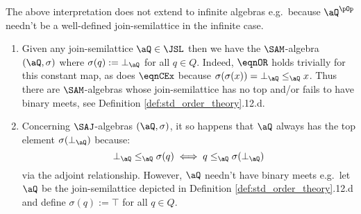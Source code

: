 \documentclass{article}
\begin{document}
\begin{note}
\item
The above interpretation does not extend to infinite algebras e.g.\ because $\aQ^{\pOp}$ needn't be a well-defined join-semilattice in the infinite case.
\begin{enumerate}
\item
Given any join-semilattice $\aQ \in \JSL$ then we have the $\SAM$-algebra $(\aQ,\sigma)$ where $\sigma(q) := \bot_\aQ$ for all $q \in Q$. Indeed, $\eqnOR$ holds trivially for this constant map, as does $\eqnCEx$ because $\sigma(\sigma(x)) = \bot_\aQ \leq_\aQ x$. Thus there are $\SAM$-algebras whose join-semilattice has no top and/or fails to have binary meets, see Definition \ref{def:std_order_theory}.12.d.

\item
Concerning $\SAJ$-algebras $(\aQ,\sigma)$, it so happens that $\aQ$ always has the top element $\sigma(\bot_\aQ)$ because:
\[
\bot_\aQ \leq_\aQ \sigma(q) \iff q \leq_\aQ \sigma(\bot_\aQ)
\]
via the adjoint relationship. However, $\aQ$ needn't have binary meets e.g.\ let $\aQ$ be the join-semilattice depicted in Definition \ref{def:std_order_theory}.12.d and define $\sigma(q) := \top$ for all $q \in Q$. \endbox

\end{enumerate}
\end{note}

\smallskip
\end{document}
